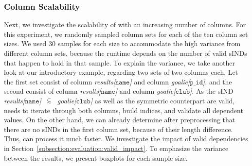 \subsubsection{Column Scalability}
Next, we investigate the scalability of \sawfish with an increasing number of columns.
For this experiment, we randomly sampled column sets for each of the ten column set sizes.
We used 30 samples for each size to accommodate the high variance from different column sets, because the runtime depends on the number of valid sINDs that happen to hold in that sample.
To explain the variance, we take another look at our introductory example, regarding two sets of two columns each.
Let the first set consist of column \mbox{\emph{results[$\mathtt{name}$]}} and column \mbox{\emph{goalie[$\mathtt{p\_id}$]}}, and the second consist of column \emph{results[$\mathtt{name}$]} and column \emph{goalie[$\mathtt{club}$]}.
As the sIND \emph{results[$\mathtt{name}$]~$\simIND{}$~goalie[$\mathtt{club}$]} as well as the symmetric counterpart are valid, \sawfish needs to iterate through both columns, build indices, and validate all dependent values.
On the other hand, we can already determine after preprocessing that there are no sINDs in the first column set, because of their length difference.
Thus, \sawfish can process it much faster.
We investigate the impact of valid dependencies in Section~\ref{subsection:evaluation:valid_impact}.
To emphasize the variance between the results, we present boxplots for each sample size.
